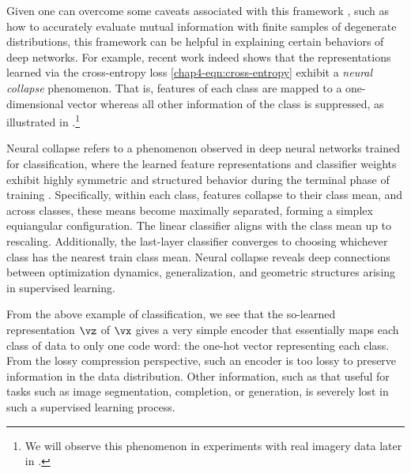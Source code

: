 \documentclass[../../book-main.tex]{subfiles}
\begin{document}
Given one can overcome some caveats associated with this framework
\cite{kolchinsky2018caveats-ICLR2018}, such as how to accurately
evaluate mutual information with finite samples of degenerate
distributions, this framework can be helpful in explaining certain
behaviors of deep networks.
For example, recent work \cite{papyan2020prevalence} indeed shows
that the representations learned via the cross-entropy loss
\eqref{chap4-eqn:cross-entropy} exhibit a \emph{neural collapse} phenomenon.
That is, features of each class are mapped to a one-dimensional
vector whereas all other information of the class is suppressed, as
illustrated in .\footnote{We will
    observe this phenomenon in experiments with real imagery data later
in .}
\begin{remark}
    Neural collapse refers to a phenomenon observed in deep neural
    networks trained for classification, where the learned feature
    representations and classifier weights exhibit highly symmetric and
    structured behavior during the terminal phase of training
    \cite{papyan2020prevalence,zhu2021geometric,yaras2022neural}.
    Specifically, within
    each class, features collapse to their class mean, and across
    classes, these means become maximally separated, forming a simplex
    equiangular configuration. The linear classifier aligns with the
    class mean up to rescaling. Additionally, the last-layer classifier
    converges to choosing whichever class has the nearest train class
    mean. Neural collapse reveals deep connections between optimization
    dynamics, generalization, and geometric structures arising in
    supervised learning.
    \label{remark:neural-collapse}
\end{remark}

From the above example of classification, we see that the so-learned
representation $\vz$ of $\vx$ gives a very simple encoder that
essentially maps each class of data to only one code word: the
one-hot vector representing each class. From the lossy compression
perspective, such an encoder is too lossy to preserve information in
the data distribution. Other information, such as that useful for
tasks such as image segmentation, completion, or generation, is
severely lost in such a supervised learning process.
\end{document}
